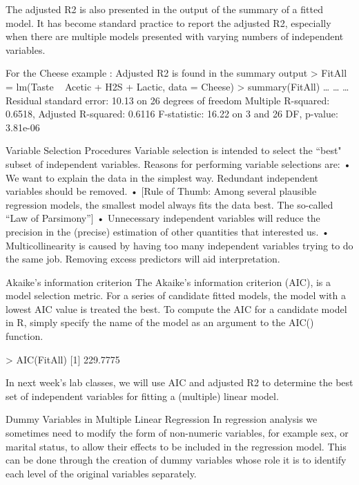 The adjusted R2  is also presented in the output of the summary of a fitted model. It has become standard practice to report the adjusted R2, especially when there are multiple models presented with varying numbers of independent variables.

For the Cheese example : Adjusted R2 is found in the summary output
> FitAll = lm(Taste ~ Acetic + H2S + Lactic, data = Cheese)
> summary(FitAll)
…
…
…
Residual standard error: 10.13 on 26 degrees of freedom
Multiple R-squared: 0.6518,     Adjusted R-squared: 0.6116 
F-statistic: 16.22 on 3 and 26 DF,  p-value: 3.81e-06


Variable Selection Procedures
Variable selection is intended to select the “best" subset of independent variables. Reasons for performing variable selections are:
•	We want to explain the data in the simplest way. Redundant independent variables should be removed.
•	[Rule of Thumb: Among several plausible regression models, the smallest model always  fits the data best. The so-called “Law of Parsimony”]
•	Unnecessary independent variables will reduce the precision in the (precise) estimation of other quantities that interested us. 
•	Multicollinearity is caused by having too many independent variables trying to do the same job. Removing excess predictors will aid interpretation.

Akaike's information criterion 
The Akaike's information criterion (AIC), is a model selection metric.  For a series of candidate fitted models, the model with a lowest AIC value is treated the best.
To compute the AIC for a candidate model in R, simply specify the name of the model as an argument to the AIC() function.

> AIC(FitAll)
[1] 229.7775

In next week’s lab classes, we will use AIC and adjusted R2 to determine the best set of independent variables for fitting a (multiple) linear model.

Dummy Variables in Multiple Linear Regression
In regression analysis we sometimes need to modify the form of non-numeric variables, for example sex, or marital status, to allow their effects to be included in the regression model. 
This can be done through the creation of dummy variables whose role it is to identify each level of the original variables separately. 
